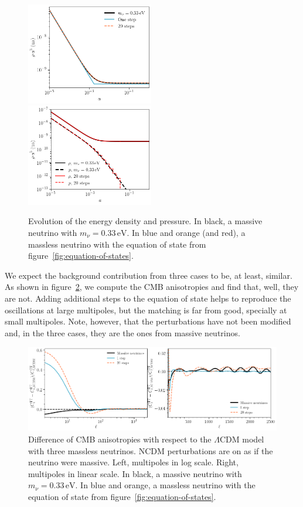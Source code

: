 \begin{figure}
    \centering
    \includegraphics[width = 0.495\textwidth]{"Figures/energy_density_330meV.png"}
    \includegraphics[width = 0.495\textwidth]{"Figures/pressure_330meV.png"}
    \caption{Evolution of the energy density and pressure. In black, a massive neutrino with $m_\nu = 0.33\, \mathrm{eV}$. In blue and orange (and red), a massless neutrino with the equation of state from figure~\ref{fig:equation-of-states}.}
    \label{fig:energy-and-pressure}
\end{figure}

We expect the background contribution from three cases to be, at least, similar. As shown in figure~\ref{fig:cmb-bad-perturbations}, we compute the CMB anisotropies and find that, well, they are not. Adding additional steps to the equation of state helps to reproduce the oscillations at large multipoles, but the matching is far from good, specially at small multipoles. Note, however, that the perturbations have not been modified and, in the three cases, they are the ones from massive neutrinos.
\begin{figure}
    \centering
    \includegraphics[width = \textwidth]{"Figures/cmb_330meV_badpert.png"}
    \caption{Difference of CMB anisotropies with respect to the $\Lambda$CDM model with three massless neutrinos. NCDM perturbations are on as if the neutrino were massive. Left, multipoles in log scale. Right, multipoles in linear scale. In black, a massive neutrino with $m_\nu = 0.33\, \mathrm{eV}$. In blue and orange, a massless neutrino with the equation of state from figure~\ref{fig:equation-of-states}.}
    \label{fig:cmb-bad-perturbations}
\end{figure}


